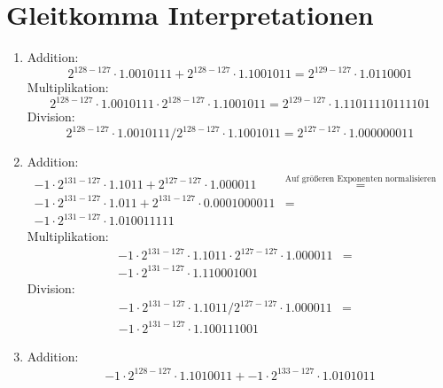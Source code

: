 \documentclass[DIN, pagenumber=false, fontsize=11pt, parskip=half]{scrartcl}
\begin{document}
    \section{Gleitkomma Interpretationen}
    \begin{enumerate}[label=(\alph*)]
        \item Addition:
            \begin{equation*}
                2^{128-127} \cdot 1.0010111 + 2^{128-127} \cdot 1.1001011 = 2^{129-127} \cdot 1.0110001
            \end{equation*}
            Multiplikation:
            \begin{equation*}
                2^{128-127} \cdot 1.0010111 \cdot 2^{128-127} \cdot 1.1001011 = 2^{129 - 127} \cdot 1.11011110111101
            \end{equation*}
            Division:
            \begin{equation*}
                2^{128-127} \cdot 1.0010111 / 2^{128-127} \cdot 1.1001011 = 2^{127 - 127} \cdot 1.000000011
            \end{equation*}
        \item Addition:
            \begin{eqnarray*}
                -1 \cdot 2^{131-127} \cdot 1.1011 + 2^{127-127} \cdot 1.000011 
                &\stackrel{\text{Auf größeren Exponenten normalisieren}}{=}&\\
                -1 \cdot 2^{131-127} \cdot 1.011 + 2^{131-127} \cdot 0.0001000011 &=&\\
                -1 \cdot 2^{131-127} \cdot 1.010011111
            \end{eqnarray*}
            Multiplikation:
            \begin{eqnarray*}
                -1 \cdot 2^{131-127} \cdot 1.1011 \cdot 2^{127-127} \cdot 1.000011 &=&\\                 
                -1 \cdot 2^{131-127} \cdot 1.110001001
            \end{eqnarray*}
            Division:
            \begin{eqnarray*}
                -1 \cdot 2^{131-127} \cdot 1.1011 / 2^{127-127} \cdot 1.000011 &=&\\                 
                -1 \cdot 2^{131-127} \cdot 1.100111001
            \end{eqnarray*}
        \item Addition:
            \begin{eqnarray*}
                -1 \cdot 2^{128-127} \cdot 1.1010011 + -1 \cdot 2^{133-127} \cdot 1.0101011

\end{eqnarray*}
\end{enumerate}
\end{document}
